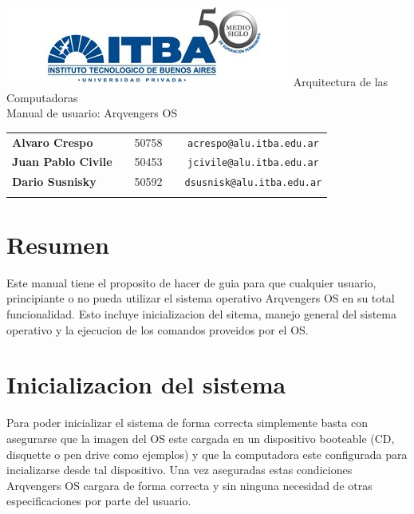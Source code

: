 \documentclass[a4paper,10pt]{article}
\begin{document}
\begin{titlepage}
        \thispagestyle{empty}
        \begin{center}
                \includegraphics{./images/itba.jpg}
                \vfill
                \Huge{Arquitectura de las Computadoras}\\
                \vspace{1cm}
                \huge{Manual de usuario: Arqvengers OS}\\
        \end{center}
        \vspace{2cm}
        \large{
                \begin{tabular}{lcrc}
                        \textbf{Alvaro Crespo} & & 50758 & \ \ \texttt{acrespo@alu.itba.edu.ar}\\
                        \textbf{Juan Pablo Civile} & & 50453 & \ \ \texttt{jcivile@alu.itba.edu.ar}\\
                        \textbf{Dario Susnisky} & & 50592 & \ \ \texttt{dsusnisk@alu.itba.edu.ar}\\
                        \\ 
                \end{tabular}
        }
        \vfill
\end{titlepage}

\setcounter{page}{1}

\tableofcontents
\newpage

\section{Resumen}
    Este manual tiene el proposito de hacer de guia para que cualquier usuario, principiante o no pueda utilizar el sistema operativo Arqvengers OS en su total funcionalidad. Esto incluye inicializacion del sitema, manejo general del sistema operativo y la ejecucion de los comandos proveidos por el OS.

\section{Inicializacion del sistema}
    Para poder inicializar el sistema de forma correcta simplemente basta con asegurarse que la imagen del OS este cargada en un dispositivo booteable (CD, disquette o pen drive como ejemplos) y que la computadora este configurada para incializarse desde tal dispositivo. Una vez aseguradas estas condiciones Arqvengers OS cargara de forma correcta y sin ninguna necesidad de otras especificaciones por parte del usuario.
\end{document}
